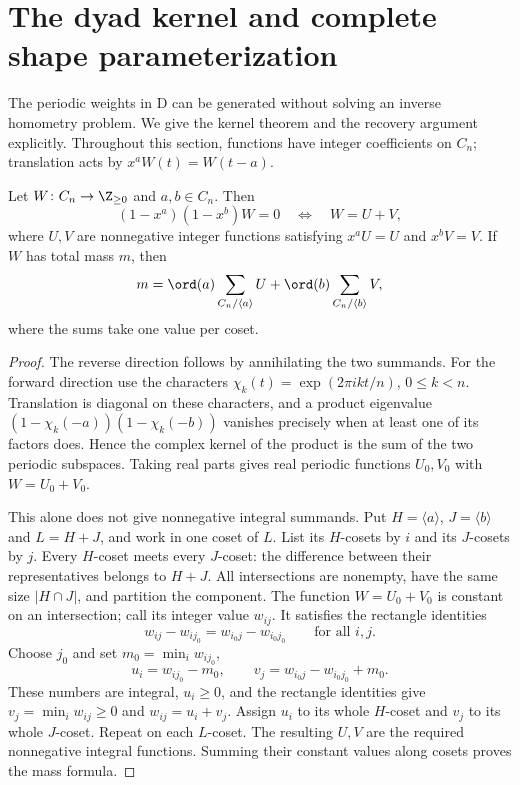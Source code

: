 \section{The dyad kernel and complete shape parameterization}\label{sec:dyadfull}

The periodic weights in D can be generated without solving an inverse
homometry problem. We give the kernel theorem and the recovery argument
explicitly. Throughout this section, functions have integer coefficients
on $C_n$; translation acts by $x^aW(t)=W(t-a)$.

\begin{lemma}\label{lem:periodic}
Let $W\colon C_n\to\Z_{\ge0}$ and $a,b\in C_n$. Then
\[
 (1-x^a)(1-x^b)W=0
 \quad\Longleftrightarrow\quad
 W=U+V,
\]
where $U,V$ are nonnegative integer functions satisfying
$x^aU=U$ and $x^bV=V$. If $W$ has total mass $m$, then
\[
 m=\ord(a)\sum_{C_n/\langle a\rangle}U
   +\ord(b)\sum_{C_n/\langle b\rangle}V,
\]
where the sums take one value per coset.
\end{lemma}
\begin{proof}
The reverse direction follows by annihilating the two summands. For the
forward direction use the characters $\chi_k(t)=\exp(2\pi i kt/n)$,
$0\le k<n$. Translation is diagonal on these characters, and a product
eigenvalue $(1-\chi_k(-a))(1-\chi_k(-b))$ vanishes precisely when at least
one of its factors does. Hence the complex kernel of the product is the
sum of the two periodic subspaces. Taking real parts gives real periodic
functions $U_0,V_0$ with $W=U_0+V_0$.

This alone does not give nonnegative integral summands. Put
$H=\langle a\rangle$, $J=\langle b\rangle$ and $L=H+J$, and work
in one coset of $L$. List its $H$-cosets by $i$ and its $J$-cosets by $j$.
Every $H$-coset meets every $J$-coset: the difference between their
representatives belongs to $H+J$. All intersections are nonempty, have
the same size $|H\cap J|$, and partition the component. The function
$W=U_0+V_0$ is constant on an intersection; call its integer value $w_{ij}$.
It satisfies the rectangle identities
\[
 w_{ij}-w_{ij_0}=w_{i_0j}-w_{i_0j_0}
 \qquad\text{for all }i,j.
\]
Choose $j_0$ and set $m_0=\min_i w_{ij_0}$,
\[
 u_i=w_{ij_0}-m_0,\qquad
 v_j=w_{i_0j}-w_{i_0j_0}+m_0.
\]
These numbers are integral, $u_i\ge0$, and the rectangle identities give
$v_j=\min_i w_{ij}\ge0$ and $w_{ij}=u_i+v_j$. Assign $u_i$ to its whole
$H$-coset and $v_j$ to its whole $J$-coset. Repeat on each $L$-coset.
The resulting $U,V$ are the required nonnegative integral functions.
Summing their constant values along cosets proves the mass formula.
\end{proof}

